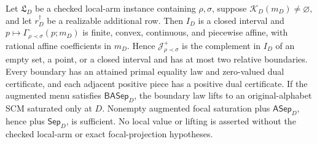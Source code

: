 Let \(\mathfrak L_D\) be a checked local-arm instance containing \(\rho,\sigma\), suppose \(\mathcal K_D(m_D)\ne\varnothing\), and let \(r_D^\dagger\) be a realizable additional row.  Then \(I_D\) is a closed interval and \(p\mapsto\Gamma_{\rho\prec\sigma}(p;m_D)\) is finite, convex, continuous, and piecewise affine, with rational affine coefficients in \(m_D\).  Hence \(\mathcal J_{\rho\prec\sigma}^+\) is the complement in \(I_D\) of an empty set, a point, or a closed interval and has at most two relative boundaries.  Every boundary has an attained primal equality law and zero-valued dual certificate, and each adjacent positive piece has a positive dual certificate.  If the augmented menu satisfies \(\mathsf{BASep}_D\), the boundary law lifts to an original-alphabet SCM saturated only at \(D\).  Nonempty augmented focal saturation plus \(\mathsf{ASep}_D\), hence plus \(\mathsf{Sep}_D\), is sufficient.  No local value or lifting is asserted without the checked local-arm or exact focal-projection hypotheses.
